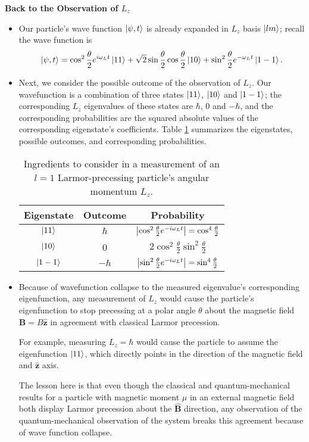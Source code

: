 \documentclass[11pt, a4paper]{article}
\renewcommand{\vec}[1]{\bm{#1}} %
\newcommand{\uvec}[1]{\hat{\vec{#1}}} %
\begin{document}
\textbf{Back to the Observation of $ L_{z} $}
\begin{itemize}
	\item Our particle's wave function $ \ket{\psi, t} $ is already expanded in $ L_{z} $ basis $ \ket{lm} $; recall the wave function is 
	\begin{equation*}
		\ket{\psi, t} =\cos^{2} \frac{\theta}{2} e^{i \omega_{L} t}\ket{11} + \sqrt{2}\sin \frac{\theta}{2} \cos \frac{\theta}{2} \ket{10} + \sin^{2}\frac{\theta}{2} e^{-\omega_{L} t}\ket{1 -1}.
	\end{equation*}
	
	\item Next, we consider the possible outcome of the observation of $ L_{z} $. Our wavefunction is a combination of three states $ \ket{11} $, $ \ket{10} $ and $ \ket{1-1} $; the corresponding $ L_{z} $ eigenvalues of these states are $ \hbar $, $ 0 $ and $ -\hbar $, and the corresponding probabilities are the squared absolute values of the corresponding eigenstate's coefficients. Table \ref{qmv:table:larmor-Lz} summarizes the eigenstates, possible outcomes, and corresponding probabilities.
	\begin{table}
	\centering 
	\begin{tabular}{c|c|c}
		Eigenstate & Outcome & Probability \\
		\hline {\rule{0pt}{2.6ex}} \hspace{-7pt} 
		$ \ket{11} $ & $ \hbar $  & $ \abs{\cos^{2}\frac{\theta}{2}e^{-i\omega_{L}t}} = \cos^{4}\frac{\theta}{2} $\\[1mm]
		$ \ket{10} $ & 0 & $ 2 \cos^{2}\frac{\theta}{2}\sin^{2}\frac{\theta}{2} $\\[1mm]
		$ \ket{1-1} $ & $ -\hbar $  & $ \abs{\sin^{2}\frac{\theta}{2}e^{-i\omega_{L}t}} = \sin^{4}\frac{\theta}{2} $
	\end{tabular}
	\caption{Ingredients to consider in a measurement of an $ l=1 $ Larmor-precessing particle's angular momentum $ L_{z} $. }
	\label{qmv:table:larmor-Lz}
	\end{table}
	
	\item Because of wavefunction collapse to the measured eigenvalue's corresponding eigenfunction, any measurement of $ L_{z} $ would cause the particle's eigenfunction to stop precessing at a polar angle $ \theta $ about the magnetic field $ \vec{B} = B\uvec{z} $ in agreement with classical Larmor precession.
	
	For example, measuring $ L_{z} = \hbar $ would cause the particle to assume the eigenfunction $ \ket{11} $, which directly points in the direction of the magnetic field and $ \uvec{z} $ axis. 
	
	The lesson here is that even though the classical and quantum-mechanical results for a particle with magnetic moment $ \mu $ in an external magnetic field both display Larmor precession about the $ \uvec{B} $ direction, any observation of the quantum-mechanical observation of the system breaks this agreement because of wave function collapse.
	
\end{itemize}
\end{document}
